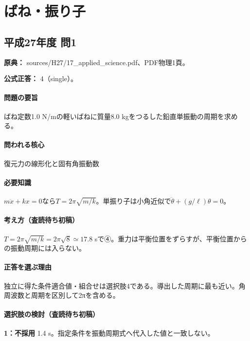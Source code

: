 \section{ばね・振り子}

\subsection{平成27年度 問1}
\label{q:h27-reg-applied-01}

\noindent\textbf{原典：} sources/H27/17\_applied\_science.pdf、PDF物理1頁。

\textbf{公式正答：} 4（single）。

\paragraph{問題の要旨} ばね定数1.0 N/mの軽いばねに質量8.0 kgをつるした鉛直単振動の周期を求める。

\paragraph{問われる核心} 復元力の線形化と固有角振動数

\paragraph{必要知識} \(m\ddot x+kx=0\)なら\(T=2\pi\sqrt{m/k}\)。単振り子は小角近似で\(\ddot\theta+(g/\ell)\theta=0\)。

\paragraph{考え方（査読待ち初稿）} \(T=2\pi\sqrt{m/k}=2\pi\sqrt8\simeq17.8\) sで④。重力は平衡位置をずらすが、平衡位置からの振動周期には入らない。

\paragraph{正答を選ぶ理由} 独立に得た条件適合値・組合せは選択肢4である。導出した周期に最も近い。角周波数と周期を区別して2πを含める。

\paragraph{選択肢の検討（査読待ち初稿）}\mbox{}\par

\noindent\textbf{1：不採用} 1.4 s。指定条件を振動周期式へ代入した値と一致しない。\par

